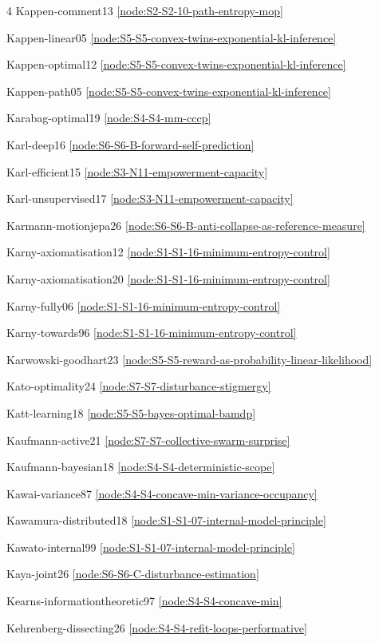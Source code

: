 \documentclass[10pt]{article}
\begin{document}
{\begin{multicols}{4}
Kappen-comment13 \hfill \ref{node:S2-S2-10-path-entropy-mop}\par
Kappen-linear05 \hfill \ref{node:S5-S5-convex-twins-exponential-kl-inference}\par
Kappen-optimal12 \hfill \ref{node:S5-S5-convex-twins-exponential-kl-inference}\par
Kappen-path05 \hfill \ref{node:S5-S5-convex-twins-exponential-kl-inference}\par
Karabag-optimal19 \hfill \ref{node:S4-S4-mm-cccp}\par
Karl-deep16 \hfill \ref{node:S6-S6-B-forward-self-prediction}\par
Karl-efficient15 \hfill \ref{node:S3-N11-empowerment-capacity}\par
Karl-unsupervised17 \hfill \ref{node:S3-N11-empowerment-capacity}\par
Karmann-motionjepa26 \hfill \ref{node:S6-S6-B-anti-collapse-as-reference-measure}\par
Karny-axiomatisation12 \hfill \ref{node:S1-S1-16-minimum-entropy-control}\par
Karny-axiomatisation20 \hfill \ref{node:S1-S1-16-minimum-entropy-control}\par
Karny-fully06 \hfill \ref{node:S1-S1-16-minimum-entropy-control}\par
Karny-towards96 \hfill \ref{node:S1-S1-16-minimum-entropy-control}\par
Karwowski-goodhart23 \hfill \ref{node:S5-S5-reward-as-probability-linear-likelihood}\par
Kato-optimality24 \hfill \ref{node:S7-S7-disturbance-stigmergy}\par
Katt-learning18 \hfill \ref{node:S5-S5-bayes-optimal-bamdp}\par
Kaufmann-active21 \hfill \ref{node:S7-S7-collective-swarm-surprise}\par
Kaufmann-bayesian18 \hfill \ref{node:S4-S4-deterministic-scope}\par
Kawai-variance87 \hfill \ref{node:S4-S4-concave-min-variance-occupancy}\par
Kawamura-distributed18 \hfill \ref{node:S1-S1-07-internal-model-principle}\par
Kawato-internal99 \hfill \ref{node:S1-S1-07-internal-model-principle}\par
Kaya-joint26 \hfill \ref{node:S6-S6-C-disturbance-estimation}\par
Kearns-informationtheoretic97 \hfill \ref{node:S4-S4-concave-min}\par
Kehrenberg-dissecting26 \hfill \ref{node:S4-S4-refit-loops-performative}\par

\end{multicols}}
\end{document}
